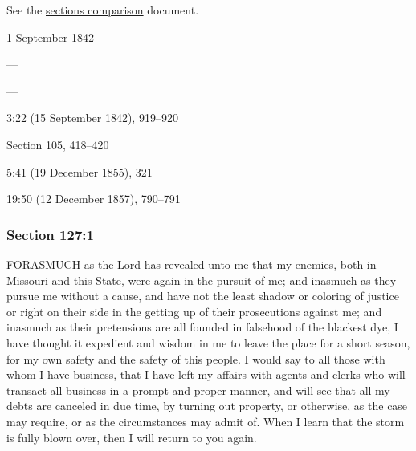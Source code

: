 		See the \href{https://drive.google.com/file/d/1goAvNz8jS4R8slYfMG_db55Ty2z_vmgK/view?usp=sharing}{sections comparison} document.
	
		\begin{compactdesc}
			\item[JSP] \hyperref[EMS-1842-JS-1-SEP-1842]{1 September 1842}
			\item[BC] ---
			\item[DC 1835] ---
			\item[TS] 3:22 (15 September 1842), 919--920
			\item[DC 1844] Section 105, 418--420
			\item[DN] 5:41 (19 December 1855), 321
			\item[MS] 19:50 (12 December 1857), 790--791
		\end{compactdesc}

	\subsubsection{Section 127:1} %
		\label{DC127-1}

		FORASMUCH as the Lord has revealed unto me that my enemies, both in Missouri and this State, were again in the pursuit of me; and inasmuch as they pursue me without a cause, and have not the least shadow or coloring of justice or right on their side in the getting up of their prosecutions against me; and inasmuch as their pretensions are all founded in falsehood of the blackest dye, I have thought it expedient and wisdom in me to leave the place for a short season, for my own safety and the safety of this people.  I would say to all those with whom I have business, that I have left my affairs with agents and clerks who will transact all business in a prompt and proper manner, and will see that all my debts are canceled in due time, by turning out property, or otherwise, as the case may require, or as the circumstances may admit of.  When I learn that the storm is fully blown over, then I will return to you again.


